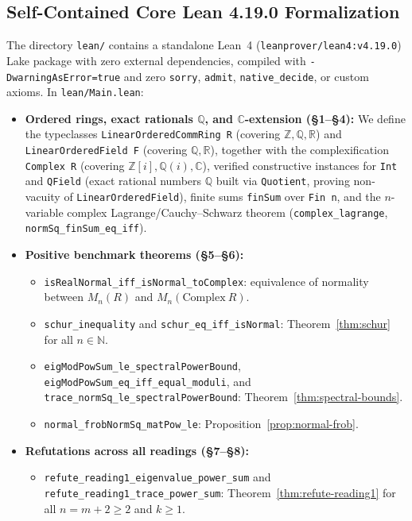 \documentclass[11pt,a4paper]{article}
\newcommand{\ust}{\_\allowbreak}
\theoremstyle{plain}
\theoremstyle{definition}
\newcommand{\C}{\mathbb{C}}
\newcommand{\R}{\mathbb{R}}
\newcommand{\Q}{\mathbb{Q}}
\newcommand{\Z}{\mathbb{Z}}
\newcommand{\N}{\mathbb{N}}
\begin{document}
\subsection{Self-Contained Core Lean 4.19.0 Formalization}
The directory \texttt{lean/} contains a standalone Lean~4 (\texttt{leanprover/lean4:v4.19.0}) Lake package with zero external dependencies, compiled with \texttt{-DwarningAsError=true} and zero \texttt{sorry}, \texttt{admit}, \texttt{native\_decide}, or custom axioms. In \texttt{lean/Main.lean}:
{\sloppy
\begin{itemize}
  \item \textbf{Ordered rings, exact rationals $\Q$, and $\C$-extension (\S1--\S4):} We define the typeclasses \texttt{Linear\-Ordered\-Comm\-Ring R} (covering $\Z, \Q, \R$) and \texttt{Linear\-Ordered\-Field F} (covering $\Q, \R$), together with the complexification \texttt{Complex R} (covering $\Z[i], \Q(i), \C$), verified constructive instances for \texttt{Int} and \texttt{QField} (exact rational numbers $\Q$ built via \texttt{Quotient}, proving non-vacuity of \texttt{Linear\-Ordered\-Field}), finite sums \texttt{finSum} over \texttt{Fin n}, and the $n$-variable complex Lagrange/Cauchy--Schwarz theorem (\texttt{complex\ust lagrange}, \texttt{normSq\ust finSum\ust eq\ust iff}).
  \item \textbf{Positive benchmark theorems (\S5--\S6):}
  \begin{itemize}
    \item \texttt{isRealNormal\ust iff\ust isNormal\ust toComplex}: equivalence of normality between $M_n(R)$ and $M_n(\mathrm{Complex}\ R)$.
    \item \texttt{schur\ust inequality} and \texttt{schur\ust eq\ust iff\ust isNormal}: Theorem~\ref{thm:schur} for all $n \in \N$.
    \item \texttt{eigModPowSum\ust le\ust spectralPowerBound}, \texttt{eigModPowSum\ust eq\ust iff\ust equal\ust moduli}, and \texttt{trace\ust normSq\ust le\ust spectralPowerBound}: Theorem~\ref{thm:spectral-bounds}.
    \item \texttt{normal\ust frobNormSq\ust matPow\ust le}: Proposition~\ref{prop:normal-frob}.
  \end{itemize}
  \item \textbf{Refutations across all readings (\S7--\S8):}
  \begin{itemize}
    \item \texttt{refute\ust reading1\ust eigenvalue\ust power\ust sum} and \texttt{refute\ust reading1\ust trace\ust power\ust sum}: Theorem~\ref{thm:refute-reading1} for all $n = m + 2 \ge 2$ and $k \ge 1$.

\end{itemize}
\end{itemize}}
\end{document}
